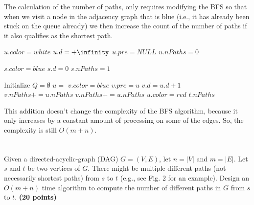 \documentclass{article}
\begin{document}
The calculation of the number of paths, only requires modifying the
BFS so that when we visit a node in the adjacency graph that is blue
(i.e., it has already been stuck on the queue already) we then
increase the count of the number of paths if it also qualifies as the
shortest path.  

{\singlespacing
\begin{algorithmic}
      \State $u.color  = white$
      \State $u.d = +\infinity$
      \State $u.pre = NULL$
      \State $u.nPaths = 0$
    \EndFor
    
    \State $s.color = blue$
    \State $s.d = 0$
    \State $s.nPaths = 1$
    
    \State Initialize $Q = \emptyset$
    \State {}
      \State $u = $ 
          \State $v.color = blue$
          \State {}
          \State $v.pre = u$
          \State $v.d = u.d + 1$
          \State $v.nPaths += u.nPaths$
            \State $v.nPaths += u.nPaths$
          \EndIf
        \EndIf
      \EndFor
      \State $u.color = red$
    \EndWhile
     $t.nPaths$
\EndFunction    
\end{algorithmic}
}

This addition doesn't change the complexity of the BFS algorithm,
because it only increases by a constant amount of processing on some
of the edges.  So, the complexity is still $O(m+n)$.



\section{}%

Given a directed-acyclic-graph (DAG) $G = (V, E)$, let $n = |V|$ and
$m = |E|$. Let $s$ and $t$ be two vertices of $G$. There might be
multiple different paths (not necessarily shortest paths) from $s$ to
$t$ (e.g., see Fig. 2 for an example). Design an $O(m + n)$ time
algorithm to compute the number of different paths in $G$ from $s$ to
$t$. {\bf (20 points) }
\end{document}
